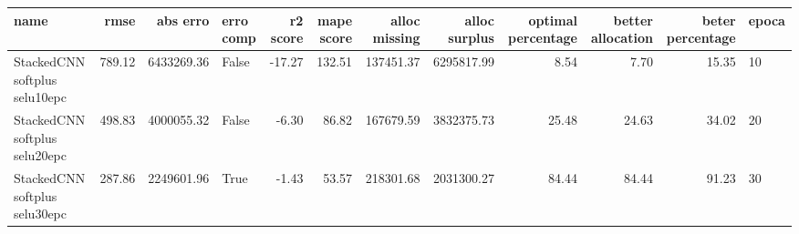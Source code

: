 \begin{tabular}{lrrlrrrrrrrl}
\toprule
name & rmse & abs erro & erro comp & r2 score & mape score & alloc missing & alloc surplus & optimal percentage & better allocation & beter percentage & epoca \\
\midrule
StackedCNN softplus selu10epc & 789.12 & 6433269.36 & False & -17.27 & 132.51 & 137451.37 & 6295817.99 & 8.54 & 7.70 & 15.35 & 10 \\
StackedCNN softplus selu20epc & 498.83 & 4000055.32 & False & -6.30 & 86.82 & 167679.59 & 3832375.73 & 25.48 & 24.63 & 34.02 & 20 \\
StackedCNN softplus selu30epc & 287.86 & 2249601.96 & True & -1.43 & 53.57 & 218301.68 & 2031300.27 & 84.44 & 84.44 & 91.23 & 30 \\
\bottomrule
\end{tabular}
